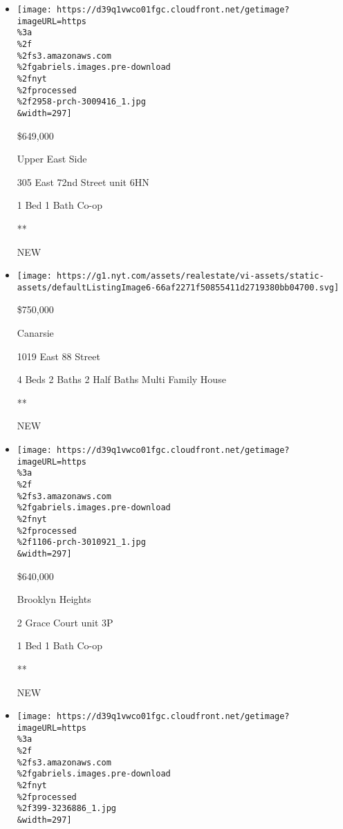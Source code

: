 \begin{itemize}
\item
  \href{/real-estate/usa/ny/new-york/upper-east-side/homes-for-sale/305-east-72nd-street/2958-PRCH-3009416?}{}

  \texttt{[image: https://d39q1vwco01fgc.cloudfront.net/getimage?imageURL=https\\\%3a\\\%2f\\\%2fs3.amazonaws.com\\\%2fgabriels.images.pre-download\\\%2fnyt\\\%2fprocessed\\\%2f2958-prch-3009416\_1.jpg\\\&width=297]}

  \$649,000

  Upper East Side

  305 East 72nd Street unit 6HN

  1 Bed \textbar{} 1 Bath \textbar{} Co-op

  **

  NEW
\item
  \href{/real-estate/usa/ny/brooklyn/canarsie/homes-for-sale/1019-east-88-street/13289-5534150?}{}

  \texttt{[image: https://g1.nyt.com/assets/realestate/vi-assets/static-assets/defaultListingImage6-66af2271f50855411d2719380bb04700.svg]}

  \$750,000

  Canarsie

  1019 East 88 Street

  4 Beds \textbar{} 2 Baths \textbar{} 2 Half Baths \textbar{} Multi
  Family House

  **

  NEW
\item
  \href{/real-estate/usa/ny/brooklyn/brooklyn-heights/homes-for-sale/2-grace-court/1106-PRCH-3010921?}{}

  \texttt{[image: https://d39q1vwco01fgc.cloudfront.net/getimage?imageURL=https\\\%3a\\\%2f\\\%2fs3.amazonaws.com\\\%2fgabriels.images.pre-download\\\%2fnyt\\\%2fprocessed\\\%2f1106-prch-3010921\_1.jpg\\\&width=297]}

  \$640,000

  Brooklyn Heights

  2 Grace Court unit 3P

  1 Bed \textbar{} 1 Bath \textbar{} Co-op

  **

  NEW
\item
  \href{/real-estate/usa/ny/queens/flushing/homes-for-sale/67-19-152nd-street/399-3236886?}{}

  \texttt{[image: https://d39q1vwco01fgc.cloudfront.net/getimage?imageURL=https\\\%3a\\\%2f\\\%2fs3.amazonaws.com\\\%2fgabriels.images.pre-download\\\%2fnyt\\\%2fprocessed\\\%2f399-3236886\_1.jpg\\\&width=297]}


\end{itemize}
